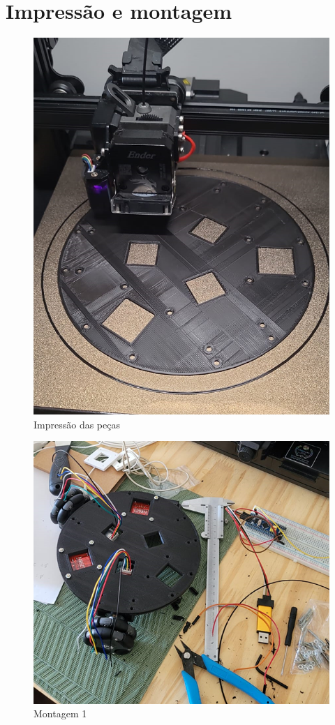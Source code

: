 \section{Impressão e montagem}

\begin{figure}[h]
	\centering
	\includegraphics{figures/impressao}
	\caption{Impressão das peças}
	\label{fig:impressao}
\end{figure}

\begin{figure}[h]
	\centering
	\includegraphics{figures/montagem_1}
	\caption{Montagem 1}
	\label{fig:montagem}
\end{figure}

